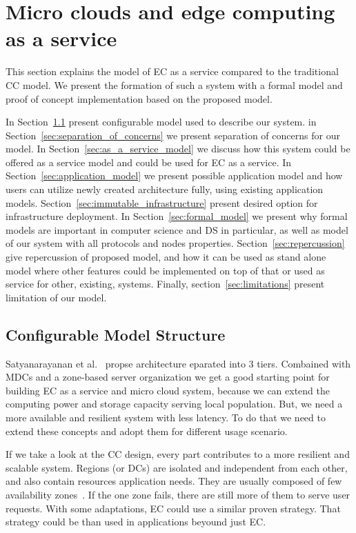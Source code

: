\chapter{Micro clouds and edge computing as a service}\label{chapter:Micro_clouds}
%
This section explains the model of EC as a service compared to the traditional CC model. We present the formation of such a system with a formal model and proof of concept implementation based on the proposed model.

In Section~\ref{sec:configurable_model_structure} present configurable model used to describe our system. in Section~\ref{sec:separation_of_concerns} we present separation of concerns for our model. In Section~\ref{sec:as_a_service_model} we discuss how this system could be offered as a service model and could be used for EC as a service. In Section~\ref{sec:application_model} we present possible application model and how users can utilize newly created architecture fully, using existing application models. Section~\ref{sec:immutable_infrastructure} present desired option for infrastructure deployment. In Section~\ref{sec:formal_model} we present why formal models are important in computer science and DS in particular, as well as model of our system with all protocols and nodes properties. Section~\ref{sec:repercussion} give repercussion of proposed model, and how it can be used as stand alone model where other features could be implemented on top of that or used as service for other, existing, systems. Finally, section~\ref{sec:limitations} present limitation of our model.
%
%
\section{Configurable Model Structure}\label{sec:configurable_model_structure}
%
Satyanarayanan et al.~\cite{SatyanarayananK19} propse architecture eparated into 3 tiers. Combained with MDCs and a zone-based server organization we get a good starting point for building EC as a service and micro cloud system, because we can extend the computing power and storage capacity serving local population. But, we need a more available and resilient system with less latency. To do that we need to extend these concepts and adopt them for different usage scenario.

If we take a look at the CC design, every part contributes to a more resilient and scalable system. Regions (or DCs) are isolated and independent from each other, and also contain resources application needs. They are usually composed of few availability zones~\cite{SouzaMFAK19}. If the one zone fails, there are still more of them to serve user requests. With some adaptations, EC could use a similar proven strategy. That strategy could be than used in applications beyound just EC.

